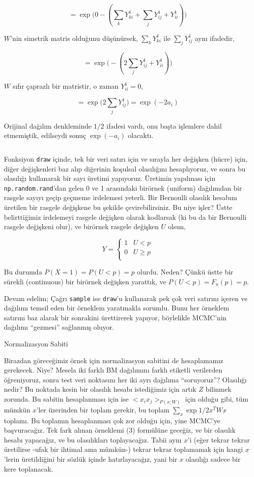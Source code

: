 \documentclass[12pt,fleqn]{article}\usepackage{../../common}
\begin{document}
$$ 
= \exp \big( 
0 - ( \sum_{k}  Y_{ki}^1 + \sum_{j} Y_{ij}^1 + Y_{ii}^1  ) 
\big)
$$

$W$'nin simetrik matris olduğunu düşünürsek, $\sum_{k}  Y_{ki}^1$ ile 
$\sum_{j}Y_{ij}^1$ aynı ifadedir, 

$$ 
= \exp \big( 
- ( 2 \sum_{j} Y_{ij}^1 + Y_{ii}^1  ) 
\big)
$$

$W$ sıfır çaprazlı bir matristir, o zaman $Y_{ii}^1=0$, 

$$ 
= \exp \big( 2 \sum_{j} Y_{ij}^1 \big) = \exp (- 2 a_i )
$$

Orijinal dağılım denkleminde $1/2$ ifadesi vardı, onu başta işlemlere dahil
etmemiştik, edilseydi sonuç  $\exp (- a_i)$ olacaktı. 

\inputminted[fontsize=\footnotesize]{python}{boltz.py}

Fonksiyon \verb!draw! içinde, tek bir veri satırı için ve sırayla her
değişken (hücre) için, diğer değişkenleri baz alıp diğerinin koşulsal
olasılığını hesaplıyoruz, ve sonra bu olasılığı kullanarak bir sayı üretimi
yapıyoruz. Üretimin yapılması için \verb!np.random.rand!'dan gelen 0 ve 1
arasındaki birörnek (uniform) dağılımdan bir rasgele sayıyı geçip geçmeme
irdelemesi yeterli. Bir Bernoulli olasılık hesabını üretilen bir rasgele
değişkene bu şekilde çevirebilirsiniz. Bu niye işler? Üstte belirttiğimiz
irdelemeyi rasgele değişken olarak kodlarsak (ki bu da bir Bernoulli
rasgele değişkeni olur), ve birörnek rasgele değişken $U$ olsun,

$$ Y = 
\left\{ \begin{array}{ll}
1 & U < p \\
0 & U \ge p \\
\end{array} \right.
$$

Bu durumda $P(X=1) = P(U<p) = p$ olurdu. Neden? Çünkü üstte bir sürekli
(continuous) bir birörnek değişken yarattık, ve $P(U<p) = F_u(p) = p$.

Devam edelim; Çağrı \verb!sample! ise \verb!draw!'u kullanarak pek çok veri
satırını içeren ve dağılımı temsil eden bir örneklem yaratmakla
sorumlu. Bunu her örneklem satırını baz alarak bir sonrakini ürettirerek
yapıyor, böylelikle MCMC'nin dağılımı ``gezmesi'' sağlanmış oluyor.

Normalizasyon Sabiti

Birazdan göreceğimiz örnek için normalizasyon sabitini de hesaplamamız
gerekecek. Niye? Mesela iki farklı BM dağılımını farklı etiketli verilerden
öğreniyoruz, sonra test veri noktasını her iki ayrı dağılıma ``soruyoruz''?
Olasılığı nedir? Bu noktada kesin bir olasılık hesabı istediğimiz için
artık $Z$ bilinmek zorunda. Bu sabitin hesaplanması için ise
$< x_ix_j >_{P(x;W)}$ için olduğu gibi, tüm mümkün $x$'ler üzerinden bir
toplam gerekir, bu toplam $\sum_x \exp 1/2 x^T W x$ toplamı. Bu toplamın
hesaplanması çok zor olduğu için, yine MCMC'ye başvuracağız. Tek fark
alınan örneklemi (3) formülüne geceğiz, ve bir olasılık hesabı yapacağız,
ve bu olasılıkları toplayacağız. Tabii aynı $x$'i (eğer tekrar tekrar
üretilirse -ufak bir ihtimal ama mümkün-) tekrar tekrar toplamamak için
hangi $x$'lerin üretildiğini bir sözlük içinde hatırlayacağız, yani bir $x$
olasılığı sadece bir kere toplanacak.
\end{document}
